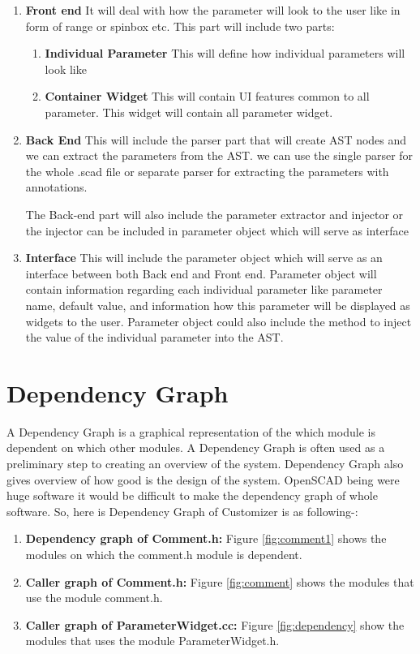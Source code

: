 \begin{enumerate}
	\item \textbf{Front end}
	It will deal with how the parameter will look to the user like in form of range or spinbox etc. This part will include two parts:
	\begin{enumerate}
		\item \textbf{Individual Parameter}
		This will define how individual parameters will look like
		\item \textbf{Container Widget}
		This will contain UI features common to all parameter. This widget will contain all parameter widget.
		
	\end{enumerate}
	
	\item \textbf{Back End}
	This will include the parser part that will create AST nodes and we can extract the parameters from the AST. we can use the single parser for the whole .scad file or separate parser for extracting the parameters with annotations.
	
	The Back-end part will also include the parameter extractor and injector or the injector can be included in parameter object which will serve as interface
	\item \textbf{Interface}
	This will include the parameter object which will serve as an interface between both Back end and Front end. Parameter object will contain information regarding each individual parameter like parameter name, default value, and information how this parameter will be displayed as widgets to the user. Parameter object could also include the method to inject the value of the individual parameter into the AST.
	
\end{enumerate}


\section{Dependency Graph}
A Dependency Graph is a graphical representation of the which module is dependent on which other modules. A Dependency Graph is often used as a preliminary step to creating an overview of the system. Dependency Graph also gives overview of how good is the design of the system.
OpenSCAD being were huge software it would be difficult to make the dependency graph of whole software. So, here is  Dependency Graph of Customizer is as following-:
\begin{enumerate}
\item \textbf{Dependency graph of Comment.h:} Figure \ref{fig:comment1} shows the modules on which the comment.h module is dependent.
\item \textbf{Caller graph of Comment.h:} Figure \ref{fig:comment} shows the modules that use the module comment.h.
\item \textbf{Caller graph of ParameterWidget.cc:} Figure \ref{fig:dependency} show the modules that uses the module ParameterWidget.h.
\end{enumerate}

